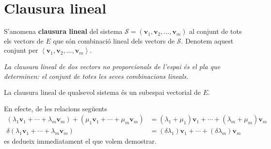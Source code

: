 \section{Clausura lineal}

\begin{definicio}
S’anomena \textbf{clausura lineal} del sistema $\mathcal{S}=(\mathbf{v}_{1},%
\mathbf{v}_{2},...,\mathbf{v}_{m})$ al conjunt de tots els vectors de $%
E$ que són combinació lineal dels vectors de $\mathcal{S}$.
Denotem aquest conjunt per $\left\langle \mathbf{v}_{1},\mathbf{v}_{2},...,%
\mathbf{v}_{m}\right\rangle $.
\end{definicio}

\begin{center}
%

{\small\itshape La clausura lineal de dos vectors no proporcionals de l'espai és el pla que determinen: el conjunt de totes les seves combinacions lineals.}
\end{center}

\begin{teorema}
La clausura lineal de qualsevol sistema és un subespai vectorial de $%
E$.

\end{teorema}
\begin{prova}
En efecte, de les relacions següents%
\begin{align*}
(\lambda _{1}\mathbf{v}_{1}+\cdots +\lambda _{m}\mathbf{v}_{m})+(\mu _{1}%
\mathbf{v}_{1}+\cdots +\mu _{m}\mathbf{v}_{m}) &=(\lambda _{1}+\mu _{1})%
\mathbf{v}_{1}+\cdots +(\lambda _{m}+\mu _{m})\mathbf{v}_{m} \\
\delta (\lambda _{1}\mathbf{v}_{1}+\cdots +\lambda _{m}\mathbf{v}_{m})
&=(\delta \lambda _{1})\mathbf{v}_{1}+\cdots +(\delta \lambda _{m})\mathbf{v%
}_{m}
\end{align*}%
es dedueix immediatament el que volem demostrar.
\end{prova}

